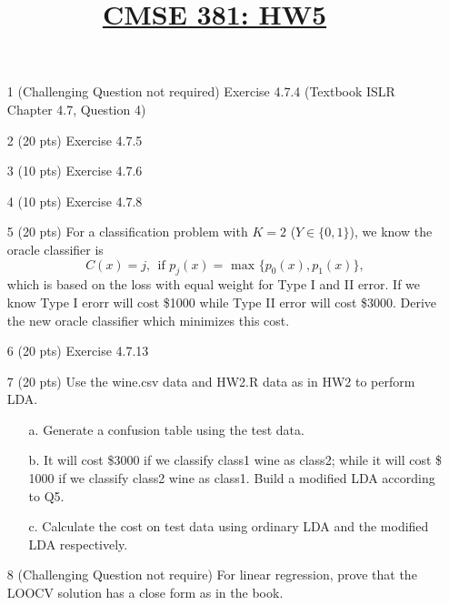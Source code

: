 \documentclass[11pt]{article}
\title{\underline{CMSE 381: HW5}}
\date{}
\newcommand{\blankline}{\quad\pagebreak[2]}
\begin{document}
\maketitle

\blankline

\begin{enumerate}
	\item[1] (Challenging Question not required) Exercise 4.7.4 (Textbook ISLR Chapter 4.7, Question 4)
	\item[2] (20 pts) Exercise 4.7.5
	\item[3] (10 pts) Exercise 4.7.6
	\item[4] (10 pts) Exercise 4.7.8
	\item[5](20 pts) For a classification problem with $K = 2$ ($Y \in \{0, 1\}$), we know the oracle classifier is 
	\[
	C(x) = j, \ \ \text{if $p_j(x) = $ max $\{p_0(x), p_1(x) \}$},
	\]
	which is based on the loss with equal weight for Type I and II error. If we know Type I erorr will cost \$1000 while Type II error will cost \$3000. Derive the new oracle classifier which minimizes this cost. 
	\item[6] (20 pts) Exercise 4.7.13
	\item[7] (20 pts) Use the wine.csv data and HW2.R data as in HW2 to perform LDA. 
	\begin{itemize}
	 \item[a.] Generate a confusion table using the test data.
	 \item[b.] It will cost \$3000 if we classify class1 wine as class2; while it will cost \$ 1000 if we classify class2 wine as class1. Build a modified LDA according to Q5. 
	 \item[c.] Calculate the cost on test data using ordinary LDA and the modified LDA respectively.
	\end{itemize}
	\item[8] (Challenging Question not require) For linear regression, prove that the LOOCV solution has a close form as in the book.
 

\end{enumerate}
\end{document}
